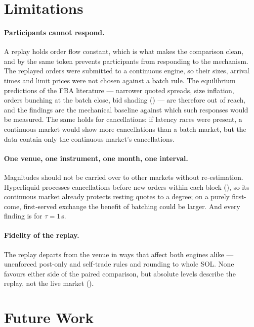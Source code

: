 \section{Limitations}
\label{sec:limitations}

\paragraph{Participants cannot respond.}
\label{sec:limitsbehaviour}
A replay holds order flow constant, which is what makes the comparison
clean, and by the same token prevents participants from responding to the
mechanism. The replayed orders were submitted to a continuous engine, so
their sizes, arrival times and limit prices were not chosen against a batch
rule. The equilibrium predictions of the FBA literature --- narrower quoted
spreads, size inflation, orders bunching at the batch close, bid shading
() --- are therefore out of reach, and the
findings are the mechanical baseline against which such responses would be
measured. The same holds for cancellations: if latency races were present,
a continuous market would show more cancellations than a batch market, but
the data contain only the continuous market's cancellations.

\paragraph{One venue, one instrument, one month, one interval.} Magnitudes
should not be carried over to other markets without re-estimation.
Hyperliquid processes cancellations before new orders within each block
(), so its continuous market already protects resting
quotes to a degree; on a purely first-come, first-served exchange the
benefit of batching could be larger. And every finding is for
$\tau = 1$\,s.

\paragraph{Fidelity of the replay.} The replay departs from the venue in
ways that affect both engines alike --- unenforced post-only and
self-trade rules and rounding to whole SOL.
None favours either side of the paired comparison, but absolute levels
describe the replay, not the live market ().

\section{Future Work}
\label{sec:futurework}

